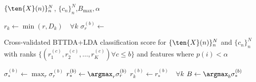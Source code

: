 \begin{algorithmic}[1]
  \Require $\{\ten{X}(n)\}_n^N$, $\{c_n\}_n^N$,$B_\text{max}, \alpha$

  \State $r_k \gets \min(r, D_k) \quad \forall k$
  \State $\sigma^{(b)}_r \gets$ \parbox[t]{5cm}{Cross-validated BTTDA+LDA classification
  score for $\{\ten{X}(n)\}_n^N$ and $\{c_n\}_n^N$ with ranks  $\{(r_1^{(c)},r_2^{(c)},\ldots,r_K^{(c)}) \forall
c\leq b\}$ and features where $p(i)<\alpha$}
  \EndFor
  \State $\textstyle{\sigma^{(b)}_* \gets \max_r\sigma^{(b)}_r}$
  \State $\textstyle{r^{(b)}_* \gets \argmax_r\sigma^{(b)}_r}$
  \State $r_k^{(b)}\gets r^{(b)}_*\quad\forall k$
  \EndFor
  \State $\textstyle{B\gets\argmax_b\sigma^{(b)}_*}$
\end{algorithmic}
